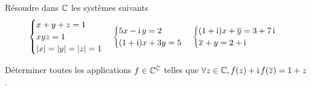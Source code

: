                                 \begin{exercice}
                                  Résoudre dans \(\mathbb{C}\) les systèmes suivants
                                  \begin{equation}
                                    \begin{cases} x + y + z = 1 \\ xyz = 1 \\ \left\lvert x\right\rvert = \left\lvert y\right\rvert = \left\lvert z\right\rvert = 
                                    1 \end{cases}
                                    \begin{cases} 5x-\operatorname{i}{}y = 2 \\ (1 + \operatorname{i})x + 3y = 5 \end{cases}
                                    \begin{cases} (1 + \operatorname{i})x + \overline{y} = 3 + 7\operatorname{i} \\\overline{x} + y = 2 + 
                                    \operatorname{i}\end{cases}
                                  \end{equation}
                                \end{exercice}

                                \begin{exercice}
                                  Déterminer toutes les applications \(f \in \mathbb{C}^{\mathbb{C}}\) telles que \(\forall z 
                                  \in \mathbb{C}, f(z) + \operatorname{i} f(\overline{z}) = 1 + z\).
                                \end{exercice}


